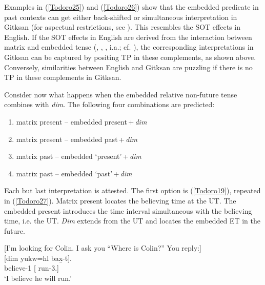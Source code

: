 \documentclass[output=paper]{langscibook}
\begin{document}
Examples in (\ref{Todoro25}) and (\ref{Todoro26}) show that the embedded predicate in past contexts can get either back-shifted or simultaneous interpretation in Gitksan (for aspectual restrictions, see \citealt{todorovic2020}). This resembles the SOT effects in English. If the SOT effects in English are derived from the interaction between matrix and embedded tense (\citealt{ogihara1995a}, \citealt{gronnstechow2010a}, \citealt{zeijlstra2012a}, i.a.; cf. \citealt{altshuler2012a}), the corresponding interpretations in Gitksan can be captured by positing TP
in these complements, as shown above. Conversely, similarities between English and Gitksan are puzzling if there is no TP  %
in these complements in Gitksan.  

Consider now what happens when the embedded relative non-future tense combines with \emph{dim}. The following four combinations are predicted:

\begin{enumerate} 
\item matrix present -- embedded present\,+\,\emph{dim}
\item matrix present -- embedded past\,+\,\emph{dim}
\item matrix past -- embedded ‘present’\,+\,\emph{dim}
\item matrix past -- embedded ‘past’\,+\,\emph{dim}
\end{enumerate}
Each but last interpretation is attested. The first option is (\ref{Todoro19}), repeated in (\ref{Todoro27}). Matrix present locates the believing time at the UT. The embedded present introduces the time interval simultaneous with the believing time, i.e. the UT. \emph{Dim} extends from the UT and locates the embedded ET in the future. 

\begin{exe}
\ex \label{Todoro27}
\begin{xlist}

\ex \label{Todoro27a} [I’m looking for Colin. I ask you ``Where is Colin?'' You reply:]\\
 	[{dim}	{yukw=hl}	{bax̱-t}].  \\
    believe-1	[		run-3.{\seriesII}] \\
\glt ‘I believe he will run.’ 

\ex \label{Todoro27b}

\end{xlist}
\end{exe}
\end{document}
